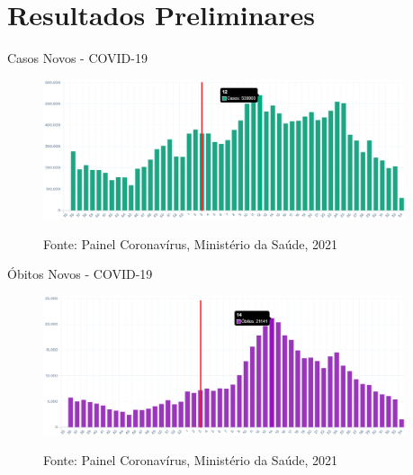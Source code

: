 \documentclass[aspectratio=169]{beamer}                    %
\begin{document}
\section{Resultados Preliminares}

\begin{frame}{Casos Novos - COVID-19}
    \begin{figure}
        \centering
        \includegraphics[width=0.95\textwidth]{cases_brazil.png}
        \label{fig:cases_brazil}
        \caption{Fonte: Painel Coronavírus, Ministério da Saúde, 2021}
    \end{figure}
\end{frame}

\begin{frame}{Óbitos Novos - COVID-19}
    \begin{figure}
        \centering
        \includegraphics[width=0.95\textwidth]{deaths_brazil.png}
        \label{fig:deaths_brazil}
        \caption{Fonte: Painel Coronavírus, Ministério da Saúde, 2021}
    \end{figure}
\end{frame}
\end{document}
